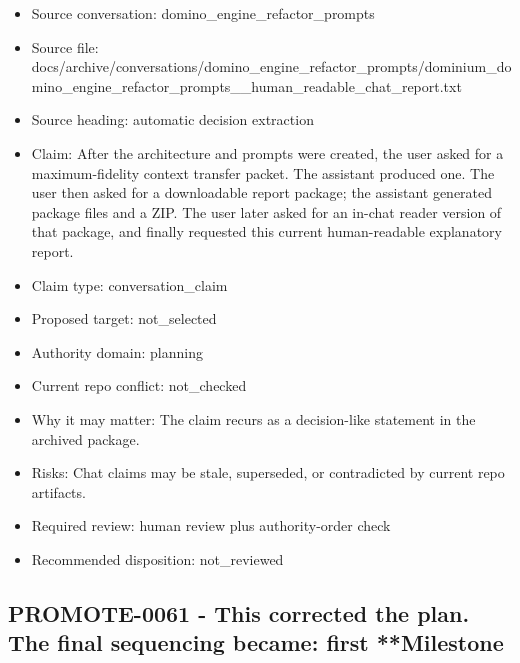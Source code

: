 \documentclass[11pt,a4paper]{report}
\begin{document}
\begin{itemize}
\item Source conversation: domino\_engine\_refactor\_prompts
\item Source file: docs/archive/conversations/domino\_engine\_refactor\_prompts/dominium\_domino\_engine\_refactor\_prompts\_\_human\_readable\_chat\_report.txt
\item Source heading: automatic decision extraction
\item Claim: After the architecture and prompts were created, the user asked for a maximum-fidelity context transfer packet. The assistant produced one. The user then asked for a downloadable report package; the assistant generated package files and a ZIP. The user later asked for an in-chat reader version of that package, and finally requested this current human-readable explanatory report.
\item Claim type: conversation\_claim
\item Proposed target: not\_selected
\item Authority domain: planning
\item Current repo conflict: not\_checked
\item Why it may matter: The claim recurs as a decision-like statement in the archived package.
\item Risks: Chat claims may be stale, superseded, or contradicted by current repo artifacts.
\item Required review: human review plus authority-order check
\item Recommended disposition: not\_reviewed
\end{itemize}

\subsection{PROMOTE-0061 - This corrected the plan. The final sequencing became: first **Milestone}
\end{document}

